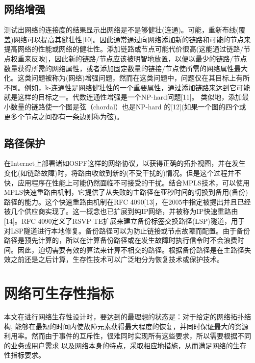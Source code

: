 \subsection{网络增强}
测试出网络的连接度的结果显示出网络是不是够健壮(连通)。可能，重新布线(覆盖)网络可以提高其健壮性[10]。因此通常通过向网络添加新的链路和可能的节点来提高网络的性能或网络的健壮性。添加链路或节点可能代价很高(这能通过链路/节点权重来反映)，因此新的链路/节点应该被明智地放置，以便以最少的链路/节点数量获得所需的网络属性，或者添加固定数量的链接/节点使所需的网络属性最大化。这类问题被称为(网络)增强问题，然而在这类问题中，问题仅在其目标上有所不同。例如，k-连通性是网络健壮性的一个重要属性，通过添加链路来达到它可能就是这样的目标之一。代数连通性增强是一个NP-hard问题[11]。 类似地，添加最小数量的链路使一个图是弦（chordal）也是NP-hard 的[12](如果一个图的四个或更多个节点之间都有一条边则称为弦)。
\subsection{路径保护}
在Internet上部署诸如OSPF这样的网络协议，以获得正确的拓扑视图，并在发生变化(如链路故障)时，将路由收敛到新的(不受干扰的)情况。但是这个过程并不快，应用程序在性能上可能仍然面临不可接受的干扰。结合MPLS技术，可以使用MPLS快速重路由机制，它提供了从失败的主路径在亚秒时间的切换到备用(备份)路径的能力。这个快速重路由机制在RFC 4090[13]，在2005中指定被提出并且已经被几个供应商实现了。这一概念也已扩展到纯IP网络，并被称为IP快速重路由[14]。RFC 4090定义了RSVP-TE扩展来建立备份标签交换路径(LSP)隧道，用于对LSP隧道进行本地修复。备份路径可以为防止链接或节点故障而配置。由于备份路径是预先计算的，所以在计算备份路径或在发生故障时执行信令时不会浪费时间。因此，迫切需要有效的算法来计算不相交的路径。根据备份路径是在主路径失效之前还是之后计算，生存性技术可以广泛地分为恢复技术或保护技术。

\section{网络可生存性指标}
本文在进行网络生存性设计时，要达到的最理想的状态是：对于给定的网络拓扑结构, 能够在最短的时间内使故障元素获得最大程度的恢复，并同时保证最大的资源利用率。然而由于事件的互斥性，很难同时实现所有这些要求，所以需要根据不同的业务或用户需求 以及网络本身的特点，采取相应地措施，从而满足网络的生存性指标要求。

